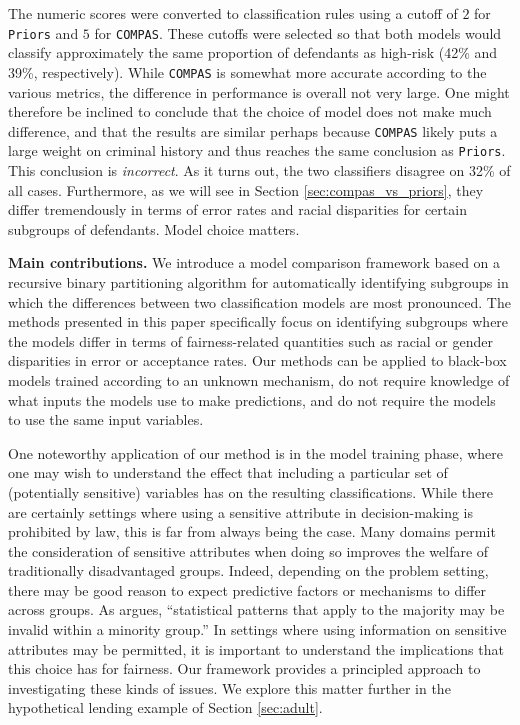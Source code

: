 \documentclass[11pt, sigconf, svgnames]{acmart}
\begin{document}
\vspace{0.25em}

\noindent The numeric scores were converted to classification rules using a cutoff of $2$ for \texttt{Priors} and $5$ for \texttt{COMPAS}.  These cutoffs were selected so that both models would classify approximately the same proportion of defendants as high-risk (42\% and 39\%, respectively).  While \texttt{COMPAS} is somewhat more accurate according to the various metrics, the difference in performance is overall not very large.  One might therefore be inclined to conclude that the choice of model does not make much difference, and that the results are similar perhaps because \texttt{COMPAS} likely puts a large weight on criminal history and thus reaches the same conclusion as \texttt{Priors}.  This conclusion is \emph{incorrect}.  As it turns out, the two classifiers disagree on 32\% of all cases.  Furthermore, as we will see in Section \ref{sec:compas_vs_priors}, they differ tremendously in terms of error rates and racial disparities for certain subgroups of defendants.  Model choice matters.

\vspace{0.5em} 

\noindent \textbf{Main contributions.}  We introduce a model comparison framework based on a recursive binary partitioning algorithm for automatically identifying subgroups in which the differences between two classification models are most pronounced.  The methods presented in this paper specifically focus on identifying subgroups where the models differ in terms of fairness-related quantities such as racial or gender disparities in error or acceptance rates.  Our methods can be applied to black-box models trained according to an unknown mechanism, do not require knowledge of what inputs the models use to make predictions, and do not require the models to use the same input variables.  

One noteworthy application of our method is in the model training phase, where one may wish to understand the effect that including a particular set of (potentially sensitive) variables has on the resulting classifications.  While there are certainly settings where using a sensitive attribute in decision-making is prohibited by law, this is far from always being the case.  Many domains permit the consideration of sensitive attributes when doing so improves the welfare of traditionally disadvantaged groups.  Indeed, depending on the problem setting, there may be good reason to expect predictive factors or mechanisms to differ across groups.  As \citet{hardt2014big} argues, ``statistical patterns that apply to the majority may be invalid within a minority group.''  In settings where using information on sensitive attributes may be permitted, it is important to understand the implications that this choice has for fairness.  Our framework provides a principled approach to investigating these kinds of issues.  We explore this matter further in the hypothetical lending example of Section \ref{sec:adult}.  
\end{document}

